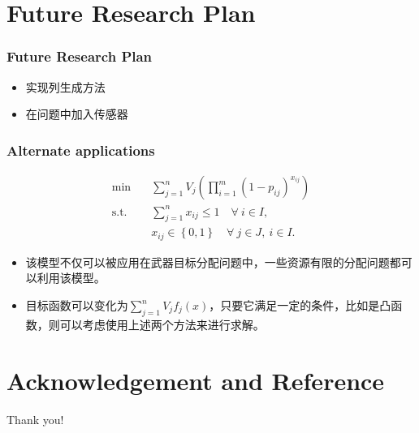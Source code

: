 \documentclass[CJK,10pt]{beamer}
\begin{document}
\section{Future Research Plan}
\begin{frame}
    \frametitle{Future Research Plan}
    \begin{itemize}
        \item 实现列生成方法
        \item 在问题中加入传感器
    \end{itemize}
\end{frame}

\begin{frame}
    \frametitle{Alternate applications}
    \begin{align}
        \min\quad & \sum_{j=1}^n V_j \left( \prod_{i=1}^m (1 -  p_{ij})^{x_{ij}} \right) \\ 
        \mathrm{s. t.}\quad &\sum_{j=1}^n x_{ij} \leq 1\quad \forall ~i \in I,\\
        & x_{ij} \in \left\{ 0,1 \right\} \quad \forall~ j\in J , ~ i \in I.
    \end{align}
    \begin{itemize}
        \item 该模型不仅可以被应用在武器目标分配问题中，一些资源有限的分配问题都可以利用该模型。
        \item 目标函数可以变化为$\sum_{j=1}^n V_j f_j(x)$，只要它满足一定的条件，比如是凸函数，则可以考虑使用上述两个方法来进行求解。
    \end{itemize}
\end{frame}

\section{Acknowledgement and Reference}
\begin{frame}
\textcolor{myNewColorA}{\Huge{\centerline{Thank you!}}}
\end{frame}

\begin{frame}
{\small


}
\end{frame}
\end{document}
